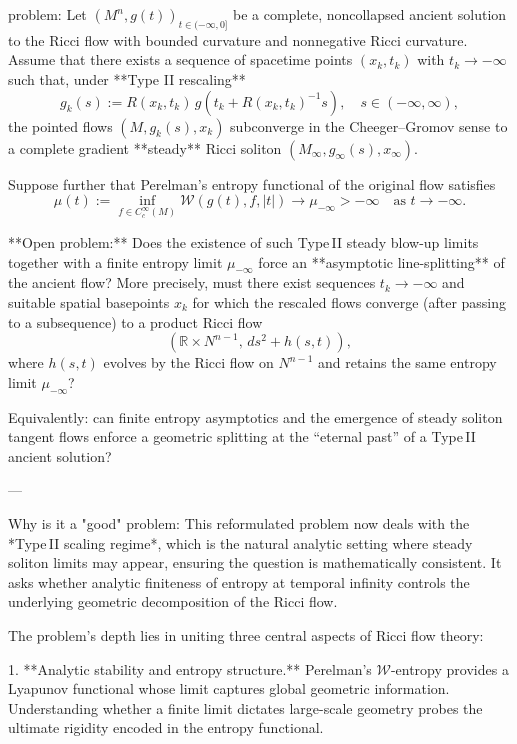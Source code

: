 problem:  
Let \((M^n, g(t))_{t \in (-\infty, 0]}\) be a complete, noncollapsed ancient solution to the Ricci flow with bounded curvature and nonnegative Ricci curvature.  
Assume that there exists a sequence of spacetime points \((x_k,t_k)\) with \(t_k \to -\infty\) such that, under **Type II rescaling**  
\[
g_k(s) := R(x_k,t_k)\, g\!\left(t_k + R(x_k,t_k)^{-1}s\right), \quad s \in (-\infty, \infty),
\]
the pointed flows \((M,g_k(s),x_k)\) subconverge in the Cheeger–Gromov sense to a complete gradient **steady** Ricci soliton \((M_\infty, g_\infty(s),x_\infty)\).  

Suppose further that Perelman's entropy functional of the original flow satisfies  
\[
\mu(t) := \inf_{f \in C_c^\infty(M)} \mathcal{W}(g(t), f, |t|) \to \mu_{-\infty} > -\infty
\quad \text{as } t \to -\infty.
\]
  
**Open problem:**  
Does the existence of such Type II steady blow-up limits together with a finite entropy limit \(\mu_{-\infty}\) force an **asymptotic line-splitting** of the ancient flow?  
More precisely, must there exist sequences \(t_k \to -\infty\) and suitable spatial basepoints \(x_k\) for which the rescaled flows converge (after passing to a subsequence) to a product Ricci flow
\[
(\mathbb{R} \times N^{n-1},\, ds^2 + h(s,t)),
\]
where \(h(s,t)\) evolves by the Ricci flow on \(N^{n-1}\) and retains the same entropy limit \(\mu_{-\infty}\)?  

Equivalently: can finite entropy asymptotics and the emergence of steady soliton tangent flows enforce a geometric splitting at the “eternal past” of a Type II ancient solution?  

---

Why is it a "good" problem:  
This reformulated problem now deals with the *Type II scaling regime*, which is the natural analytic setting where steady soliton limits may appear, ensuring the question is mathematically consistent. It asks whether analytic finiteness of entropy at temporal infinity controls the underlying geometric decomposition of the Ricci flow.  

The problem’s depth lies in uniting three central aspects of Ricci flow theory:  

1. **Analytic stability and entropy structure.**  
   Perelman’s \(\mathcal{W}\)-entropy provides a Lyapunov functional whose limit captures global geometric information. Understanding whether a finite limit dictates large-scale geometry probes the ultimate rigidity encoded in the entropy functional.  

